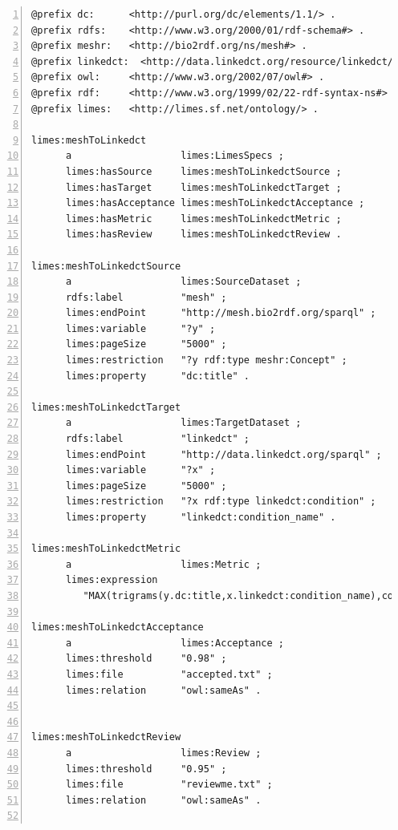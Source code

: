 \documentclass[a4paper, 11pt]{article}
\begin{document}
\begin{ttfamily}
\begin{lstlisting}[basicstyle=\scriptsize,numbers=left,numberstyle=\tiny, morekeywords={@prefix}]
@prefix dc:      <http://purl.org/dc/elements/1.1/> .
@prefix rdfs:    <http://www.w3.org/2000/01/rdf-schema#> .
@prefix meshr:   <http://bio2rdf.org/ns/mesh#> .
@prefix linkedct:  <http://data.linkedct.org/resource/linkedct/> .
@prefix owl:     <http://www.w3.org/2002/07/owl#> .
@prefix rdf:     <http://www.w3.org/1999/02/22-rdf-syntax-ns#> .
@prefix limes:   <http://limes.sf.net/ontology/> .

limes:meshToLinkedct
      a                   limes:LimesSpecs ;
      limes:hasSource     limes:meshToLinkedctSource ;
      limes:hasTarget     limes:meshToLinkedctTarget ;
      limes:hasAcceptance limes:meshToLinkedctAcceptance ;
      limes:hasMetric     limes:meshToLinkedctMetric ;
      limes:hasReview     limes:meshToLinkedctReview .

limes:meshToLinkedctSource
      a                   limes:SourceDataset ;
      rdfs:label          "mesh" ;
      limes:endPoint      "http://mesh.bio2rdf.org/sparql" ;
      limes:variable      "?y" ;
      limes:pageSize      "5000" ;
      limes:restriction   "?y rdf:type meshr:Concept" ;
      limes:property      "dc:title" .

limes:meshToLinkedctTarget
      a                   limes:TargetDataset ;
      rdfs:label          "linkedct" ;
      limes:endPoint      "http://data.linkedct.org/sparql" ;
      limes:variable      "?x" ;
      limes:pageSize      "5000" ;
      limes:restriction   "?x rdf:type linkedct:condition" ;
      limes:property      "linkedct:condition_name" .
      
limes:meshToLinkedctMetric
      a                   limes:Metric ;
      limes:expression 
         "MAX(trigrams(y.dc:title,x.linkedct:condition_name),cosine(y.dc:title,x.linkedct:name))" .

limes:meshToLinkedctAcceptance
      a                   limes:Acceptance ;
      limes:threshold     "0.98" ;
      limes:file          "accepted.txt" ;
      limes:relation      "owl:sameAs" .
      

limes:meshToLinkedctReview
      a                   limes:Review ;
      limes:threshold     "0.95" ;
      limes:file          "reviewme.txt" ;
      limes:relation      "owl:sameAs" .
      
\end{lstlisting}
\end{ttfamily}
\end{document}

